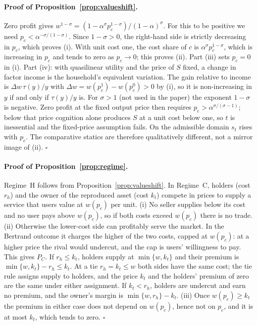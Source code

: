 \documentclass[12pt]{article}
\theoremstyle{remark}
\begin{document}
\paragraph{Proof of Proposition~\ref{prop:valueshift}.} Zero profit gives $w^{1-\sigma}=(1-\alpha^\sigma p_c^{1-\sigma})/(1-\alpha)^\sigma$. For this to be positive we need $p_c<\alpha^{-\sigma/(1-\sigma)}$. Since $1-\sigma>0$, the right-hand side is strictly decreasing in $p_c$, which proves (i). With unit cost one, the cost share of $c$ is $\alpha^\sigma p_c^{1-\sigma}$, which is increasing in $p_c$ and tends to zero as $p_c\to0$; this proves (ii). Part (iii) sets $p_c=0$ in (i). Part (iv): with quasilinear utility and the price of $S$ fixed, a change in factor income is the household's equivalent variation. The gain relative to income is $\Delta w\,\tau(y)/y$ with $\Delta w=w(p_c^1)-w(p_c^0)>0$ by (i), so it is non-increasing in $y$ if and only if $\tau(y)/y$ is. For $\sigma>1$ (not used in the paper) the exponent $1-\sigma$ is negative. Zero profit at the fixed output price then requires $p_c>\alpha^{\sigma/(\sigma-1)}$; below that price cognition alone produces $S$ at a unit cost below one, so $t$ is inessential and the fixed-price assumption fails. On the admissible domain $s_t$ rises with $p_c$. The comparative statics are therefore qualitatively different, not a mirror image of (ii). $\square$

\paragraph{Proof of Proposition~\ref{prop:regime}.} Regime~H follows from Proposition~\ref{prop:valueshift}. In Regime~C, holders (cost $r_h$) and the owner of the reproduced asset (cost $k_t$) compete in prices to supply a service that users value at $w(p_c)$ per unit. (i) No seller supplies below its cost and no user pays above $w(p_c)$, so if both costs exceed $w(p_c)$ there is no trade. (ii) Otherwise the lower-cost side can profitably serve the market. In the Bertrand outcome it charges the higher of the two costs, capped at $w(p_c)$: at a higher price the rival would undercut, and the cap is users' willingness to pay. This gives $P_C$. If $r_h\le k_t$, holders supply at $\min\{w,k_t\}$ and their premium is $\min\{w,k_t\}-r_h\le k_t$. At a tie $r_h=k_t\le w$ both sides have the same cost; the tie rule assigns supply to holders, and the price $k_t$ and the holders' premium of zero are the same under either assignment. If $k_t<r_h$, holders are undercut and earn no premium, and the owner's margin is $\min\{w,r_h\}-k_t$. (iii) Once $w(p_c)\ge k_t$ the premium in either case does not depend on $w(p_c)$, hence not on $p_c$, and it is at most $k_t$, which tends to zero. $\square$
\end{document}
